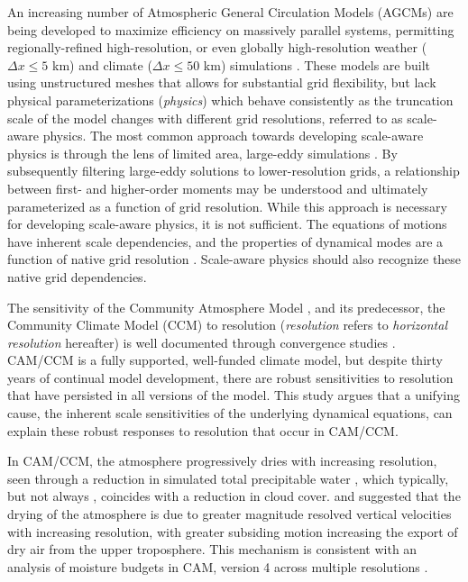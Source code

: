 \documentclass[alpha-refs]{wiley-article}
\begin{document}
An increasing number of Atmospheric General Circulation Models (AGCMs) are being developed to maximize efficiency on massively parallel systems, permitting regionally-refined high-resolution, or even globally high-resolution weather ($\Delta x \leq 5$ km) and climate ($\Delta x \leq 50$ km) simulations \citep{SMTMN2008JCP,MPASatm,Z2014QJRMS,HETAL2016JCLIM,DCMIP16,LetAl2018JAMES}. These models are built using unstructured meshes that allows for substantial grid flexibility, but lack physical parameterizations ({\em{physics}}) which behave consistently as the truncation scale of the model changes with different grid resolutions, referred to as scale-aware physics. The most common approach towards developing scale-aware physics is through the lens of limited area, large-eddy simulations \citep[e.g.,][]{PC2008JAS,AW2013JAS,SZ2018JCLIM}. By subsequently filtering large-eddy solutions to lower-resolution grids, a relationship between first- and higher-order moments may be understood and ultimately parameterized as a function of grid resolution. While this approach is necessary for developing scale-aware physics, it is not sufficient. The equations of motions have inherent scale dependencies, and the properties of dynamical modes are a function of native grid resolution \citep{O1981JAS,WETAL1997MWR,PG2006JAS,JR2016QJRMS}. Scale-aware physics should also recognize these native grid dependencies.

The sensitivity of the Community Atmosphere Model \citep[CAM;][]{CAM5}, and its predecessor, the Community Climate Model (CCM) to resolution ({\em{resolution}} refers to {\em{horizontal resolution}} hereafter) is well documented through convergence studies \citep{KW1991JGR,WETAL1995CD,W2008TELLUS,RETAL2013JCLIM,ZetAl2014JCb,HR2017JCLIM}. CAM/CCM is a fully supported, well-funded climate model, but despite thirty years of continual model development, there are robust sensitivities to resolution that have persisted in all versions of the model. This study argues that a unifying cause, the inherent scale sensitivities of the underlying dynamical equations, can explain these robust responses to resolution that occur in CAM/CCM.

In CAM/CCM, the atmosphere progressively dries with increasing resolution, seen through a reduction in simulated total precipitable water \citep{KW1991JGR,WETAL1995CD,W2008TELLUS,RETAL2013JCLIM,ZetAl2014JCb,HR2017JCLIM}, which typically, but not always \citep[see][]{WETAL1995CD,ZetAl2014JCb}, coincides with a reduction in cloud cover. \cite{KW1991JGR} and \cite{WETAL1995CD} suggested that the drying of the atmosphere is due to greater magnitude resolved vertical velocities with increasing resolution, with greater subsiding motion increasing the export of dry air from the upper troposphere. This mechanism is consistent with an analysis of moisture budgets in CAM, version 4 \citep[CAM4;][]{CAM4} across multiple resolutions \citep{HR2017JCLIM}.
\end{document}
